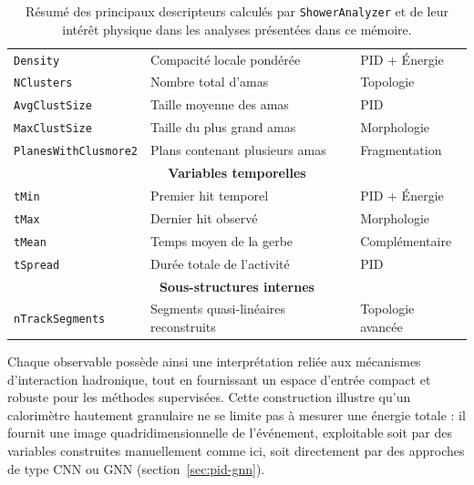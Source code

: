 \begin{table}[!ht]
\begin{tabular}{|p{4.1cm}|p{5.4cm}|p{3.7cm}|}
\texttt{Density} & Compacité locale pondérée & PID + Énergie \\
\texttt{NClusters} & Nombre total d’amas & Topologie \\
\texttt{AvgClustSize} & Taille moyenne des amas & PID \\
\texttt{MaxClustSize} & Taille du plus grand amas & Morphologie \\
\texttt{PlanesWithClusmore2} & Plans contenant plusieurs amas & Fragmentation \\
\hline

\multicolumn{3}{|c|}{\textbf{Variables temporelles}} \\
\hline

\texttt{tMin} & Premier hit temporel & PID + Énergie \\
\texttt{tMax} & Dernier hit observé & Morphologie \\
\texttt{tMean} & Temps moyen de la gerbe & Complémentaire \\
\texttt{tSpread} & Durée totale de l’activité & PID \\
\hline

\multicolumn{3}{|c|}{\textbf{Sous-structures internes}} \\
\hline

\texttt{nTrackSegments} & Segments quasi-linéaires reconstruits & Topologie avancée \\
\hline

\end{tabular}

\caption{Résumé des principaux descripteurs calculés par \texttt{ShowerAnalyzer} et de leur intérêt physique dans les analyses présentées dans ce mémoire.}
\label{tab:recap_features}
\end{table}

\clearpage

Chaque observable possède ainsi une interprétation reliée aux mécanismes d'interaction hadronique,
tout en fournissant un espace d'entrée compact et robuste pour les méthodes supervisées. Cette
construction illustre qu'un calorimètre hautement granulaire ne se limite pas à mesurer une énergie
totale : il fournit une image quadridimensionnelle de l'événement, exploitable soit par des variables
construites manuellement comme ici, soit directement par des approches de type CNN ou GNN
(section~\ref{sec:pid-gnn}).
